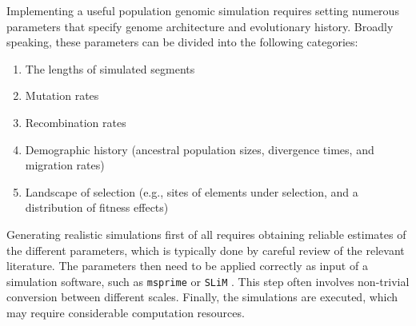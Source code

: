 \documentclass[hidelinks]{article}
\begin{document}
%

Implementing a useful population genomic simulation requires setting numerous
parameters that specify genome architecture and evolutionary history.
Broadly speaking, these parameters can be divided into the following categories:
%
\begin{enumerate}
	\item The lengths of simulated segments
	\item Mutation rates
	\item Recombination rates
	\item Demographic history (ancestral population sizes, divergence times, and migration rates)
	\item Landscape of selection (e.g., sites of elements under selection, and a distribution of fitness effects)
\end{enumerate}
%
Generating realistic simulations first of all requires obtaining reliable estimates of
the different parameters, which is typically done by careful review of the relevant literature. The parameters then need to be applied correctly as input of a
simulation software, such as \texttt{msprime} \citep{Kelleher2016,Nelson2020} or \texttt{SLiM} \citep{Haller2019}. This step often involves non-trivial conversion
between different scales. Finally, the simulations are executed, which may
require considerable computation resources.


\end{document}

